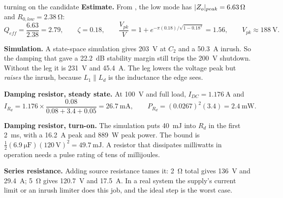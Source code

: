 \begin{examplebox}[label=ex:turn-on-candidate]{turning on the candidate}
	\textbf{Estimate.} From , the low mode has
	$\lvert Z_o\rvert_{peak} = \qty{6.63}{\ohm}$ and $R_{0,low} = \qty{2.38}{\ohm}$:
	\[
		Q_{eff} = \frac{6.63}{2.38} = 2.79, \qquad \zeta = 0.18, \qquad
		\frac{V_{pk}}{V} = 1 + e^{-\pi(0.18)/\sqrt{1 - 0.18^2}} = 1.56, \qquad
		V_{pk} \approx \qty{188}{\volt}.
	\]

	\textbf{Simulation.} A state-space simulation gives \qty{203}{\volt} at
	$C_2$ and a \qty{50.3}{\ampere} inrush. So the damping that gave a 22.2~dB
	stability margin still trips the \qty{200}{\volt} shutdown. Without the leg
	it is \qty{231}{\volt} and \qty{45.4}{\ampere}. The leg lowers the voltage
	peak but \emph{raises} the inrush, because $L_1 \parallel L_d$ is the
	inductance the edge sees.

	\textbf{Damping resistor, steady state.} At \qty{100}{\volt} and full load,
	$I_{DC} = \qty{1.176}{\ampere}$ and
	\[
		I_{R_d} = 1.176 \times \frac{0.08}{0.08 + 3.4 + 0.05} = \qty{26.7}{\milli\ampere},
		\qquad P_{R_d} = (0.0267)^2(3.4) = \qty{2.4}{\milli\watt}.
	\]

	\textbf{Damping resistor, turn-on.} The simulation puts \qty{40}{\milli\joule}
	into $R_d$ in the first \qty{2}{\milli\second}, with a \qty{16.2}{\ampere}
	peak and \qty{889}{\watt} peak power. The bound is
	$\tfrac{1}{2}(\qty{6.9}{\micro\farad})(\qty{120}{\volt})^2 = \qty{49.7}{\milli\joule}$.
	A resistor that dissipates milliwatts in operation needs a pulse rating of
	tens of millijoules.

	\textbf{Series resistance.} Adding source resistance tames it:
	\qty{2}{\ohm} total gives \qty{136}{\volt} and \qty{29.4}{\ampere};
	\qty{5}{\ohm} gives \qty{120.7}{\volt} and \qty{17.5}{\ampere}.
	In a real system the supply's current limit or an inrush limiter does this
	job, and the ideal step is the worst case.
\end{examplebox}
